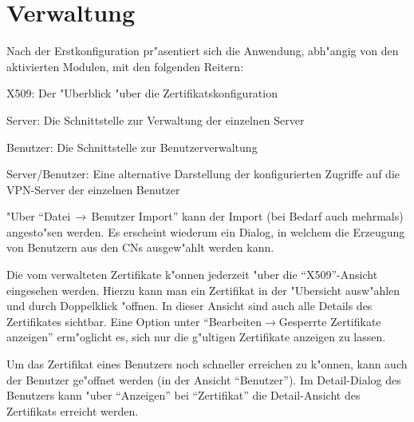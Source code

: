 \section{Verwaltung}

%
Nach der Erstkonfiguration pr"asentiert sich die Anwendung, abh"angig von den
aktivierten Modulen, mit den folgenden Reitern:

\begin{items}
	\item X509: Der "Uberblick "uber die Zertifikatskonfiguration
	\item Server: Die Schnittstelle zur Verwaltung der einzelnen Server
	\item Benutzer: Die Schnittstelle zur Benutzerverwaltung
	\item Server/Benutzer: Eine alternative Darstellung der konfigurierten
Zugriffe auf die VPN-Server der einzelnen Benutzer
\end{items}
%
%
%
%
%
%

\nl "Uber ``Datei$\,\rightarrow\,$Benutzer Import'' kann der Import
(bei Bedarf auch mehrmals) angesto"sen werden. Es erscheint wiederum
ein Dialog, in welchem die Erzeugung von Benutzern aus den CNs
ausgew"ahlt werden kann.


\nl Die vom \Nbm{} verwalteten Zertifikate k"onnen jederzeit
"uber die ``X509''-Ansicht eingesehen werden. Hierzu kann man ein Zertifikat in der
"Ubersicht ausw"ahlen und durch Doppelklick "offnen. In dieser
Ansicht sind auch alle Details des Zertifikates sichtbar. Eine Option unter
 ``Bearbeiten$\rightarrow$Gesperrte Zertifikate anzeigen''
erm"oglicht es, sich nur die g"ultigen Zertifikate anzeigen zu lassen.

\nl Um das Zertifikat eines Benutzers noch schneller erreichen zu k"onnen, kann
auch der Benutzer ge"offnet werden (in der Ansicht ``Benutzer''). Im Detail-Dialog
des Benutzers kann "uber ``Anzeigen'' bei ``Zertifikat'' die Detail-Ansicht des
Zertifikats erreicht werden.

